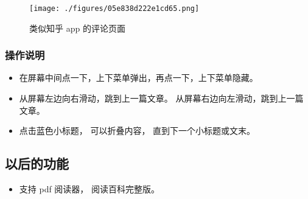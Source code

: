 \begin{figure}[ht]
\centering
\texttt{[image: ./figures/05e838d222e1cd65.png]}
\caption{类似知乎 app 的评论页面} \label{fig_app_2}
\end{figure}

\subsubsection{操作说明}
\begin{itemize}
\item 在屏幕中间点一下，上下菜单弹出，再点一下，上下菜单隐藏。
\item 从屏幕左边向右滑动，跳到上一篇文章。 从屏幕右边向左滑动，跳到上一篇文章。
\item 点击蓝色小标题， 可以折叠内容， 直到下一个小标题或文末。
\end{itemize}

\subsection{以后的功能}
\begin{itemize}
\item 支持 pdf 阅读器， 阅读百科完整版。
\end{itemize}
